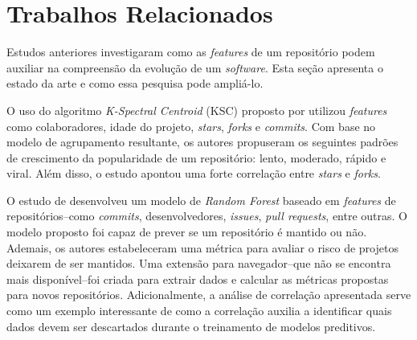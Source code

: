 \documentclass[11pt,a4paper]{article}
\newcommand{\en}[1]{\textit{#1}}
\begin{document}

\section{Trabalhos Relacionados}
Estudos anteriores investigaram como as \en{features} de um repositório podem auxiliar na compreensão da evolução de um \en{software}. Esta seção apresenta o estado da arte e como essa pesquisa pode ampliá-lo.

O uso do algoritmo \en{K-Spectral Centroid} (KSC) proposto por \cite{borges2016} utilizou \en{features} como colaboradores, idade do projeto, \en{stars}, \en{forks} e \en{commits}. Com base no modelo de agrupamento resultante, os autores propuseram os seguintes padrões de crescimento da popularidade de um repositório: lento, moderado, rápido e viral. Além disso, o estudo apontou uma forte correlação entre \en{stars} e \en{forks}.


O estudo de \cite{coelho2020} desenvolveu um modelo de \en{Random Forest} baseado em \en{features} de repositórios--como \en{commits}, desenvolvedores, \en{issues}, \en{pull requests}, entre outras. O modelo proposto foi capaz de prever se um repositório é mantido ou não. Ademais, os autores estabeleceram uma métrica para avaliar o risco de projetos deixarem de ser mantidos. Uma extensão para navegador--que não se encontra mais disponível--foi criada para extrair dados e calcular as métricas propostas para novos repositórios. Adicionalmente, a análise de correlação apresentada serve como um exemplo interessante de como a correlação auxilia a identificar quais dados devem ser descartados durante o treinamento de modelos preditivos.
\end{document}
